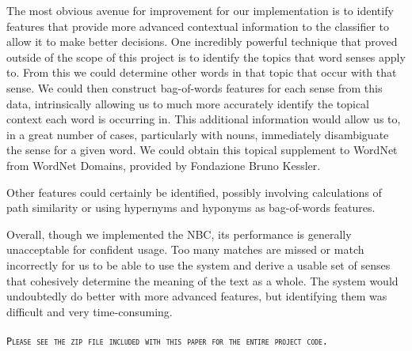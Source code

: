 \documentclass[11pt]{article}
\begin{document}
The most obvious avenue for improvement for our implementation is to identify features that provide more advanced contextual information to the classifier to allow it to make better decisions. One incredibly powerful technique that proved outside of the scope of this project is to identify the topics that word senses apply to. From this we could determine other words in that topic that occur with that sense. We could then construct bag-of-words features for each sense from this data, intrinsically allowing us to much more accurately identify the topical context each word is occurring in. This additional information would allow us to, in a great number of cases, particularly with nouns, immediately disambiguate the sense for a given word. We could obtain this topical supplement to WordNet from WordNet Domains, provided by Fondazione Bruno Kessler.

Other features could certainly be identified, possibly involving calculations of path similarity or using hypernyms and hyponyms as bag-of-words features.

Overall, though we implemented the NBC, its performance is generally unacceptable for confident usage. Too many matches are missed or match incorrectly for us to be able to use the system and derive a usable set of senses that cohesively determine the meaning of the text as a whole. The system would undoubtedly do better with more advanced features, but identifying them was difficult and very time-consuming.
\\
\\
\texttt{\textsc{\large Please see the zip file included with this paper for the entire project code.}}

\clearpage



\end{document}
